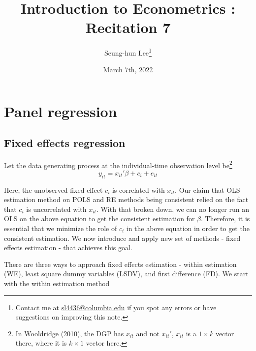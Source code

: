 \documentclass[12pt]{article}
\title{Introduction to Econometrics \ROM{2}: Recitation 7}
\theoremstyle{definition}
\theoremstyle{property}
\theoremstyle{assumption}
\theoremstyle{example}
\theoremstyle{comment}
\begin{document}
\linespread{1.25}
\onehalfspacing

\author{Seung-hun Lee\footnote{Contact me at \href{mailto:sl4436@columbia.edu}{sl4436@columbia.edu} if you spot any errors or have suggestions on improving this note.}}
\date{March 7th, 2022}
\maketitle
\thispagestyle{firstpage}


\section{Panel regression}
\subsection{Fixed effects regression}
Let the data generating process at the individual-time observation level be\footnote{In Wooldridge (2010), the DGP has $x_{it}$ and not $x_{it}'$, $x_{it}$ is a $1\times k$ vector there, where it is $k\times 1$ vector here.  }
\[
y_{it}=x_{it}'\beta+ c_i + e_{it}
\]

Here, the unobserved fixed effect $c_i$ is correlated with $x_{it}$. Our claim that OLS estimation method on POLS and RE methods being consistent relied on the fact that $c_i$ is uncorrelated with $x_{it}$. With that broken down, we can no longer run an OLS on the above equation to get the consistent estimation for $\beta$. Therefore, it is essential that we minimize the role of $c_i$ in the above equation in order to get the consistent estimation. We now introduce and apply new set of methods - fixed effects estimation - that achieves this goal.
\par

There are three ways to approach fixed effects estimation - within estimation (WE), least square dummy variables (LSDV), and first difference (FD). We start with the within estimation method
\end{document}
